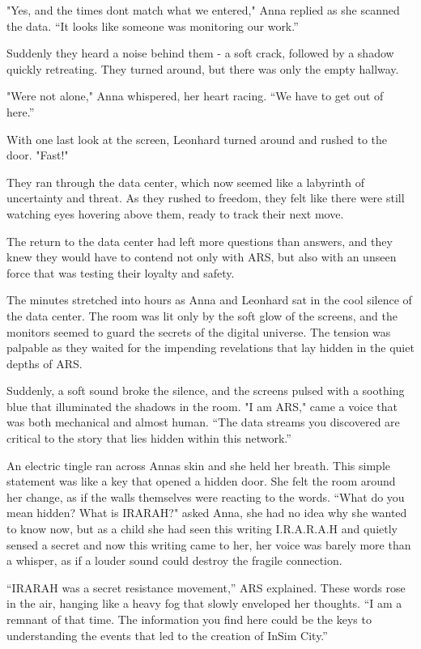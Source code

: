 \documentclass[
]{article}
\begin{document}
"Yes, and the times don\textquotesingle t match what we entered," Anna
replied as she scanned the data. ``It looks like someone was monitoring
our work.''

Suddenly they heard a noise behind them - a soft crack, followed by a
shadow quickly retreating. They turned around, but there was only the
empty hallway.

"We\textquotesingle re not alone," Anna whispered, her heart racing.
``We have to get out of here.''

With one last look at the screen, Leonhard turned around and rushed to
the door. "Fast!"

They ran through the data center, which now seemed like a labyrinth of
uncertainty and threat. As they rushed to freedom, they felt like there
were still watching eyes hovering above them, ready to track their next
move.

The return to the data center had left more questions than answers, and
they knew they would have to contend not only with ARS, but also with an
unseen force that was testing their loyalty and safety.

The minutes stretched into hours as Anna and Leonhard sat in the cool
silence of the data center. The room was lit only by the soft glow of
the screens, and the monitors seemed to guard the secrets of the digital
universe. The tension was palpable as they waited for the impending
revelations that lay hidden in the quiet depths of ARS.

Suddenly, a soft sound broke the silence, and the screens pulsed with a
soothing blue that illuminated the shadows in the room. "I am ARS," came
a voice that was both mechanical and almost human. ``The data streams
you discovered are critical to the story that lies hidden within this
network.''

An electric tingle ran across Anna\textquotesingle s skin and she held
her breath. This simple statement was like a key that opened a hidden
door. She felt the room around her change, as if the walls themselves
were reacting to the words. ``What do you mean hidden? What is IRARAH?"
asked Anna, she had no idea why she wanted to know now, but as a child
she had seen this writing I.R.A.R.A.H and quietly sensed a secret and
now this writing came to her, her voice was barely more than a whisper,
as if a louder sound could destroy the fragile connection.

``IRARAH was a secret resistance movement,'' ARS explained. These words
rose in the air, hanging like a heavy fog that slowly enveloped her
thoughts. ``I am a remnant of that time. The information you find here
could be the keys to understanding the events that led to the creation
of InSim City.''
\end{document}
